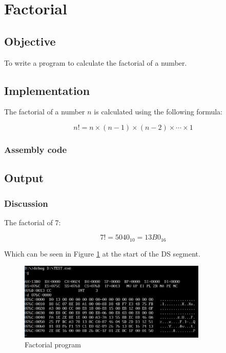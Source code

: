 \section{Factorial}

\subsection{Objective}

To write a program to calculate the factorial of a number.

\subsection{Implementation}

The factorial of a number $n$ is calculated using the following formula:

\begin{equation}
    n! = n \times (n-1) \times (n-2) \times \cdots \times 1
\end{equation}

\subsubsection{Assembly code}


\pagebreak
\subsection{Output}

\subsubsection{Discussion}

The factorial of 7:

\begin{equation}
    7! = 5040_{10} = 13B0_{16}
\end{equation}

Which can be seen in Figure \ref{fig:fact} at the start of the DS segment.

\begin{figure}[ht]
    \centering
    \includegraphics[width=0.8\textwidth]{./res/practicals/fact.png}
    \caption{Factorial program}
    \label{fig:fact}
\end{figure}

